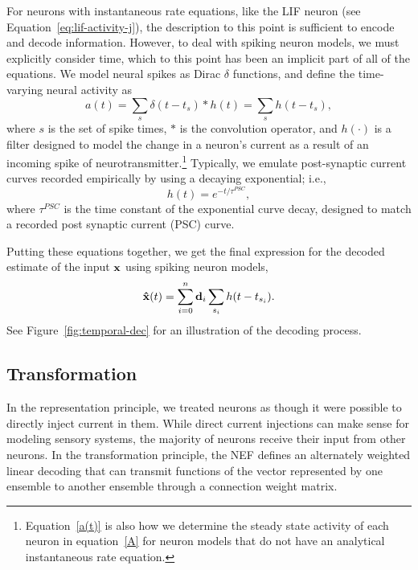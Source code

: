 {For neurons with instantaneous rate equations,
like the LIF neuron (see Equation~\eqref{eq:lif-activity-j}),
the description to this point
is sufficient to encode and decode information.
However, to deal with spiking neuron models,
we must explicitly consider time,
which to this point has been an implicit
part of all of the equations.
We model neural spikes as
Dirac $\delta$ functions,
and define the time-varying
neural activity as
\begin{equation}
  \label{a(t)}
  a(t) = \sum_s \delta(t - t_s) * h(t) = \sum_s h(t - t_s),
\end{equation}
where $s$ is the set of spike times,
$*$ is the convolution operator,
and $h(\cdot)$ is a filter designed to
model the change in a neuron's current
as a result of an incoming spike
of neurotransmitter.\footnote{
  Equation~\eqref{a(t)} is also how we determine
  the steady state activity of each neuron in
  equation~\eqref{A} for neuron models
  that do not have an analytical
  instantaneous rate equation.}
Typically, we emulate post-synaptic current curves
recorded empirically by using a decaying exponential;
i.e.,
\begin{equation}
  h(t) = e^{-t / \tau^{PSC}},
\end{equation}
where $\tau^{PSC}$ is the time constant
of the exponential curve decay,
designed to match
a recorded post synaptic current (PSC) curve.

Putting these equations together,
we get the final expression for
the decoded estimate of the input $\mathbf{x}$
using spiking neuron models,
\begin{equation}
  \label{dec-time}
  \mathbf{\hat{x}}(t) = \sum_{i=0}^n \mathbf{d}_i \sum_{s_i} h(t-t_{s_i}).
\end{equation}
See Figure~\ref{fig:temporal-dec} for an illustration of
the decoding process.


\subsection{Transformation}

In the representation principle,
we treated neurons as though
it were possible to directly inject current in them.
While direct current injections
can make sense for modeling
sensory systems,
the majority of neurons
receive their input from other neurons.
In the transformation principle,
the NEF defines an alternately weighted
linear decoding
that can transmit functions
of the vector represented
by one ensemble to another ensemble
through a connection weight matrix.

}
